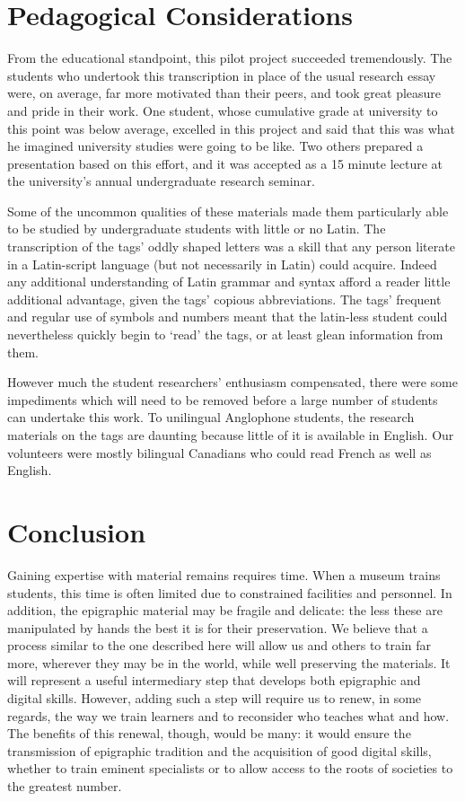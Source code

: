 \documentclass[amsthm,ebook]{saparticle}
\begin{document}
\section{Pedagogical Considerations}


From the educational standpoint, this pilot project succeeded tremendously. The students who undertook this
transcription in place of the usual research essay were, on average, far more motivated than their peers, and took
great pleasure and pride in their work. One student, whose cumulative grade at university to this point was below
average, excelled in this project and said that this was what he imagined university studies were going to be like. Two
others prepared a presentation based on this effort, and it was accepted as a 15 minute lecture at the university’s
annual undergraduate research seminar.

Some of the uncommon qualities of these materials made them particularly able to be studied by undergraduate students
with little or no Latin. The transcription of the tags’ oddly shaped letters was a skill that any person literate in a
Latin-script language (but not necessarily in Latin) could acquire. Indeed any additional understanding of Latin
grammar and syntax afford a reader little additional advantage, given the tags’ copious abbreviations. The tags’
frequent and regular use of symbols and numbers meant that the latin-less student could nevertheless quickly begin to
‘read’ the tags, or at least glean information from them.

However much the student researchers’ enthusiasm compensated, there were some impediments which will need to be removed
before a large number of students can undertake this work. To unilingual Anglophone students, the research materials on
the tags are daunting because little of it is available in English. Our volunteers were mostly bilingual Canadians who
could read French as well as English.

\section{Conclusion}


Gaining expertise with material remains requires time. When a museum trains students, this time is often limited due to
constrained facilities and personnel. In addition, the epigraphic material may be fragile and delicate: the less these
are manipulated by hands the best it is for their preservation. We believe that a process similar to the one described
here will allow us and others to train far more, wherever they may be in the world, while well preserving the
materials. It will represent a useful intermediary step that develops both epigraphic and digital skills. However,
adding such a step will require us to renew, in some regards, the way we train learners and to reconsider who teaches
what and how. The benefits of this renewal, though, would be many: it would ensure the transmission of epigraphic
tradition and the acquisition of good digital skills, whether to train eminent specialists or to allow access to the
roots of societies to the greatest number.
\end{document}
